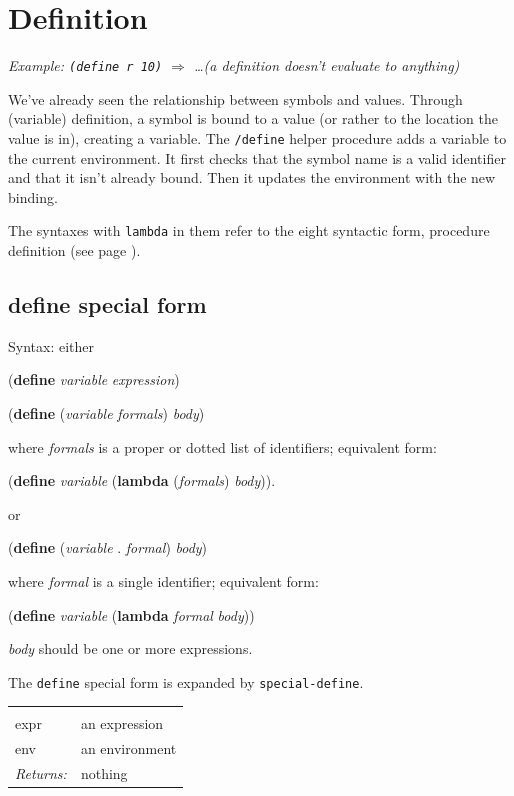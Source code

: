 \documentclass[twoside]{report}
\begin{document}
\section{Definition}
\label{definition}

\emph{Example: \texttt{(define r 10)} $\Rightarrow$ \ldots  (a definition doesn't evaluate to anything)}

We've already seen the relationship between symbols and values. Through (variable) definition, a symbol is bound to a value (or rather to the location the value is in), creating a variable. The \texttt{/define} helper procedure adds a variable to the current environment. It first checks that the symbol name is a valid identifier and that it isn't already bound. Then it updates the environment with the new binding.

The syntaxes with \texttt{lambda} in them refer to the eight syntactic form, procedure definition (see page \pageref{procedure-definition}).

\subsection{define special form}
\label{define-special-form}

Syntax: either

(\textbf{define} \emph{variable} \emph{expression})

(\textbf{define} (\emph{variable} \emph{formals}) \emph{body})

where \emph{formals} is a proper or dotted list of identifiers; equivalent form:

(\textbf{define} \emph{variable} (\textbf{lambda} (\emph{formals}) \emph{body})).

or

(\textbf{define} (\emph{variable} . \emph{formal}) \emph{body})

where \emph{formal} is a single identifier; equivalent form:

(\textbf{define} \emph{variable} (\textbf{lambda} \emph{formal} \emph{body}))

\emph{body} should be one or more expressions.

The \texttt{define} special form is expanded by \texttt{special-define}.

\noindent\begin{tabular}{ |p{1.9cm} p{8cm}| }
\hline
\rowcolor[HTML]{CCCCCC} \multicolumn{2}{|l|}{\bf special-define (internal)} \\
expr & an expression \\
env & an environment \\
\textit{Returns:} & nothing \\
\hline
\end{tabular}
\end{document}
